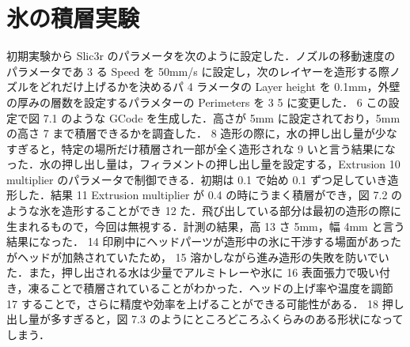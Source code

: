 \section{氷の積層実験}
\label{sec:paragraph}





初期実験から Slic3r のパラメータを次のように設定した．ノズルの移動速度のパラメータであ
3 る Speed を 50mm/s に設定し，次のレイヤーを造形する際ノズルをどれだけ上げるかを決めるパ
4 ラメータの Layer height を 0.1mm，外壁の厚みの層数を設定するパラメターの Perimeters を 3
5 に変更した．
6 この設定で図 7.1 のような GCode を生成した．高さが 5mm に設定されており，5mm の高さ
7 まで積層できるかを調査した．
8 造形の際に，水の押し出し量が少なすぎると，特定の場所だけ積層され一部が全く造形されな
9 いと言う結果になった．水の押し出し量は，フィラメントの押し出し量を設定する，Extrusion
10 multiplier のパラメータで制御できる．初期は 0.1 で始め 0.1 ずつ足していき造形した．結果
11 Extrusion multiplier が 0.4 の時にうまく積層ができ，図 7.2 のような氷を造形することができ
12 た．飛び出している部分は最初の造形の際に生まれるもので，今回は無視する．計測の結果，高
13 さ 5mm，幅 4mm と言う結果になった．
14 印刷中にヘッドパーツが造形中の氷に干渉する場面があったがヘッドが加熱されていたため，
15 溶かしながら進み造形の失敗を防いでいた．また，押し出される水は少量でアルミトレーや氷に
16 表面張力で吸い付き，凍ることで積層されていることがわかった．ヘッドの上げ率や温度を調節
17 することで，さらに精度や効率を上げることができる可能性がある．
18 押し出し量が多すぎると，図 7.3 のようにところどころふくらみのある形状になってしまう．



